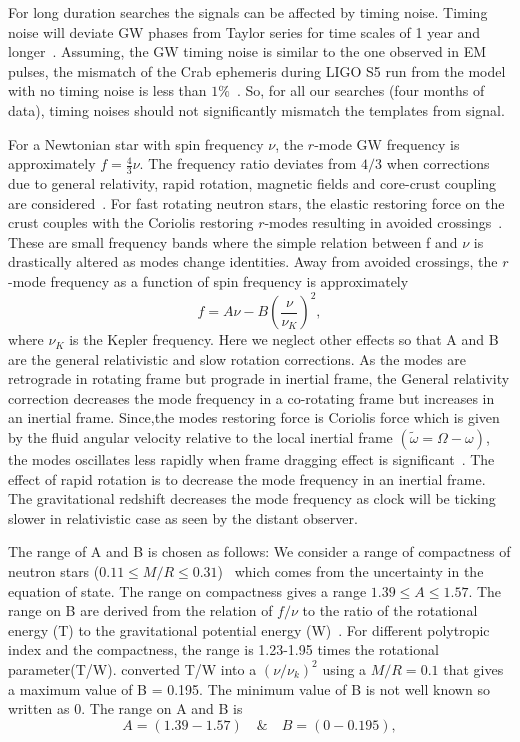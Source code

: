 \documentclass{ttuthes2007}
\begin{document}
For long duration searches the signals can be affected by timing noise. Timing
noise will deviate \ac{GW} phases from Taylor series for time scales of 1 year
and longer~\cite{Jones_2004}. Assuming, the \ac{GW} timing noise is similar to
the one observed in EM pulses, the mismatch of the Crab ephemeris during LIGO S5
run from the model with no timing noise is less than
$1\%$~\cite{PhysRevD.91.062009}.  So, for all our searches (four months of
data), timing noises should not significantly mismatch the templates from
signal.

For a Newtonian star with spin frequency $\nu$, the $r$-mode \ac{GW} frequency is approximately $f=\frac{4}{3}\nu$. The frequency ratio
deviates from $4/3$ when corrections due to general relativity, rapid rotation,
magnetic fields and core-crust coupling are considered~\cite{Idrisy:2014qca}.
For fast rotating neutron stars, the elastic restoring force on the crust
couples with the Coriolis restoring $r$-modes resulting in avoided
crossings~\cite{Levin_2001}. These are small frequency bands where the simple
relation between f and $\nu$ is drastically altered as modes change identities.
Away from avoided crossings, the $r$-mode frequency as a function of spin
frequency is approximately
\begin{equation}
f=A\nu-B\left(\frac{\nu}{\nu_K}\right)^2, 
\end{equation} 
where $\nu_K$ is the Kepler frequency. Here we neglect other effects so that A
and B are the general relativistic and slow rotation corrections.  
As the modes are retrograde in rotating frame but prograde in inertial frame,
the General relativity correction decreases the mode frequency in a co-rotating
frame but increases in an inertial frame.  Since,the modes restoring force is
Coriolis force which is given by the fluid angular velocity relative to the
local inertial frame $(\tilde\omega=\Omega - \omega)$, the modes oscillates less
rapidly when frame dragging effect is
significant~\cite{Lockitch:2000aa,1968ApJ...153..807H}. The effect of rapid
rotation is to decrease the mode frequency in an inertial frame.  The
gravitational redshift decreases the mode frequency as clock will be ticking
slower in relativistic case as seen by the distant observer. 

The range of A and B is chosen as follows: We consider a range of compactness of
neutron stars ($0.11\leq M/R\leq 0.31$)~\cite{Idrisy:2014qca} which comes from
the uncertainty in the equation of state. The range on compactness gives a range
$1.39\leq A \leq 1.57$. The range on B are derived from the relation of $f/\nu$
to the ratio of the rotational energy (T) to the gravitational potential energy
(W)~\cite{Yoshida:2004gk}. For different polytropic index and the compactness,
the range is 1.23-1.95 times the rotational parameter(T/W).
\citet{PhysRevD.100.064013}
converted T/W into a $(\nu/\nu_k)^2$ using a $M/R=0.1$ that gives a maximum
value of B = 0.195. The minimum value of B is not well known so written as 0. 
The range on A and B is
\begin{equation}
 A=(1.39-1.57) \quad \& \quad B=(0-0.195), 
\end{equation}
\end{document}
